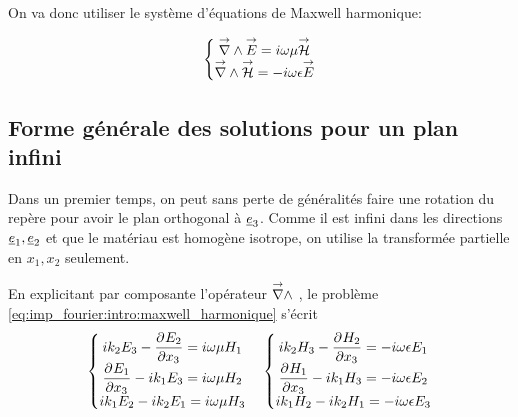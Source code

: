 On va donc utiliser le système d'équations de Maxwell harmonique:

\begin{equation}
    \left\lbrace 
    \begin{matrix}
    \vrot \vE = i \omega \mu \vH \\
    \vrot \vH = -i \omega \eps \vE
    \end{matrix}
    \right.
    \label{eq:imp_fourier:intro:maxwell_harmonique}
\end{equation}


\subsection{Forme générale des solutions pour un plan infini}


Dans un premier temps, on peut sans perte de généralités faire une rotation du repère pour avoir le plan orthogonal à $\v e_3$. Comme il est infini dans les directions $\v e_1, \v e_2$ et que le matériau est homogène isotrope, on utilise la transformée partielle en $x_1, x_2$ seulement.

\renewcommand{\x}{{\v e_1}}
\renewcommand{\y}{{\v e_2}}
\renewcommand{\z}{{\v e_3}}
\renewcommand{\peps}{{\eps}}
\renewcommand{\pmu}{{\mu}}
\begin{figure}[h!]
\centering
\begin{tikzpicture}

\end{tikzpicture}
\end{figure}

En explicitant par composante l'opérateur $\vrot$ , le problème \eqref{eq:imp_fourier:intro:maxwell_harmonique} s'écrit  
\begin{align*}
    \left\lbrace 
    \begin{matrix}
    ik_2 E_3  - \ddr{x_3}{E_ 2} = i \w \mu H_1 \\
    \ddr{x_3}{E_1} - ik_1 E_3 = i\w \mu H_2 \\
    ik_1 E_2 - ik_2 E_1 = i\w \mu H_3 \\
    \end{matrix}
    \right. \quad 
    \left\lbrace 
    \begin{matrix}
    ik_2 H_3  - \ddr{x_3}{H_ 2} = -i \w \eps E_1 \\
    \ddr{x_3}{H_1} - ik_1 H_3 = -i\w \eps E_2 \\
    ik_1 H_2 - ik_2 H_1 = -i\w \eps E_3 \\
    \end{matrix}
    \right.
\end{align*}

